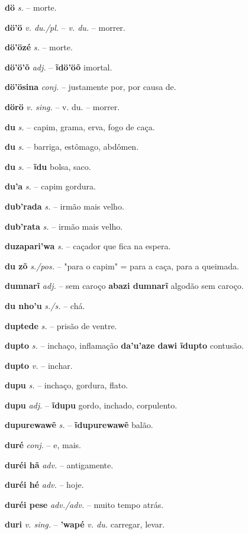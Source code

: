 \textbf{dö} \textit{s.} -- morte.

\textbf{dö'ö} \textit{v. du./pl.} -- \textit{v. du.} -- morrer.

\textbf{dö'özé} \textit{s.} -- morte.

\textbf{dö'ö'õ} \textit{adj.} -- \textbf{ĩdö'öõ} imortal.

\textbf{dö'ösina} \textit{conj.} -- justamente por, por causa de.

\textbf{dörö} \textit{v. sing.} -- v. du. -- morrer.

\textbf{du} \textit{s.} -- capim, grama, erva, fogo de caça.

\textbf{du} \textit{s.} -- barriga, estômago, abdômen.

\textbf{du} \textit{s.} -- \textbf{ĩdu} bolsa, saco.

\textbf{du'a} \textit{s.} -- capim gordura.

\textbf{dub'rada} \textit{s.} -- irmão mais velho.

\textbf{dub'rata} \textit{s.} -- irmão mais velho.

\textbf{duzapari'wa} \textit{s.} -- caçador que fica na espera.

\textbf{du zõ} \textit{s./pos.} -- "para o capim" = para a caça, para a queimada.

\textbf{dumnarĩ} \textit{adj.} -- sem caroço  \textbf{abazi dumnarĩ} algodão sem caroço.

\textbf{du nho'u} \textit{s./s.} -- chá.

\textbf{duptede} \textit{s.} -- prisão de ventre.

\textbf{dupto} \textit{s.} -- inchaço, inflamação  \textbf{da'u'aze dawi ĩdupto} contusão.

\textbf{dupto} \textit{v.} -- inchar.

\textbf{dupu} \textit{s.} -- inchaço, gordura, flato.

\textbf{dupu} \textit{adj.} -- \textbf{ĩdupu} gordo, inchado, corpulento.

\textbf{dupurewawẽ} \textit{s.} -- \textbf{ĩdupurewawẽ} balão.

\textbf{duré} \textit{conj.} -- e, mais.

\textbf{duréi hã} \textit{adv.} -- antigamente.

\textbf{duréi hé} \textit{adv.} -- hoje.

\textbf{duréi pese} \textit{adv./adv.} -- muito tempo atrás.

\textbf{duri} \textit{v. sing.} -- \textbf{'wapé} \textit{v. du.} carregar, levar.

